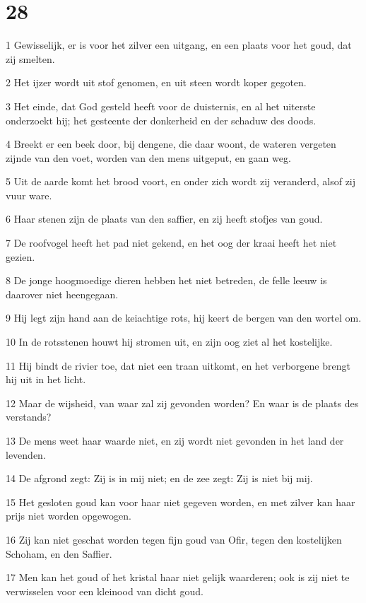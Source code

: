 \chapter{28}

\par 1 Gewisselijk, er is voor het zilver een uitgang, en een plaats voor het goud, dat zij smelten.
\par 2 Het ijzer wordt uit stof genomen, en uit steen wordt koper gegoten.
\par 3 Het einde, dat God gesteld heeft voor de duisternis, en al het uiterste onderzoekt hij; het gesteente der donkerheid en der schaduw des doods.
\par 4 Breekt er een beek door, bij dengene, die daar woont, de wateren vergeten zijnde van den voet, worden van den mens uitgeput, en gaan weg.
\par 5 Uit de aarde komt het brood voort, en onder zich wordt zij veranderd, alsof zij vuur ware.
\par 6 Haar stenen zijn de plaats van den saffier, en zij heeft stofjes van goud.
\par 7 De roofvogel heeft het pad niet gekend, en het oog der kraai heeft het niet gezien.
\par 8 De jonge hoogmoedige dieren hebben het niet betreden, de felle leeuw is daarover niet heengegaan.
\par 9 Hij legt zijn hand aan de keiachtige rots, hij keert de bergen van den wortel om.
\par 10 In de rotsstenen houwt hij stromen uit, en zijn oog ziet al het kostelijke.
\par 11 Hij bindt de rivier toe, dat niet een traan uitkomt, en het verborgene brengt hij uit in het licht.
\par 12 Maar de wijsheid, van waar zal zij gevonden worden? En waar is de plaats des verstands?
\par 13 De mens weet haar waarde niet, en zij wordt niet gevonden in het land der levenden.
\par 14 De afgrond zegt: Zij is in mij niet; en de zee zegt: Zij is niet bij mij.
\par 15 Het gesloten goud kan voor haar niet gegeven worden, en met zilver kan haar prijs niet worden opgewogen.
\par 16 Zij kan niet geschat worden tegen fijn goud van Ofir, tegen den kostelijken Schoham, en den Saffier.
\par 17 Men kan het goud of het kristal haar niet gelijk waarderen; ook is zij niet te verwisselen voor een kleinood van dicht goud.
